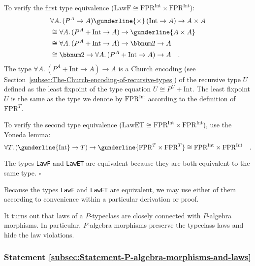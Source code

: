 To verify the first type equivalence ($\text{LawF}\cong\text{FPR}^{\text{Int}}\times\text{FPR}^{\text{Int}}$):
\begin{align*}
 & \forall A.\,(P^{A}\rightarrow A)\gunderline{\times}\,(\text{Int}\rightarrow A)\rightarrow A\times A\\
 & \cong\forall A.\,(P^{A}+\text{Int}\rightarrow A)\rightarrow\gunderline{A\times A}\\
 & \cong\forall A.\,(P^{A}+\text{Int}\rightarrow A)\rightarrow\bbnum 2\rightarrow A\\
 & \cong\bbnum 2\rightarrow\forall A.\,(P^{A}+\text{Int}\rightarrow A)\rightarrow A\quad.
\end{align*}
The type $\forall A.\,(P^{A}+\text{Int}\rightarrow A)\rightarrow A$
is a Church encoding (see Section~\ref{subsec:The-Church-encoding-of-recursive-types})
of the recursive type $U$ defined as the least fixpoint of the type
equation $U\cong P^{U}+\text{Int}$. The least fixpoint $U$ is the
same as the type we denote by $\text{FPR}^{\text{Int}}$ according
to the definition of $\text{FPR}^{T}$.

To verify the second type equivalence ($\text{LawET}\cong\text{FPR}^{\text{Int}}\times\text{FPR}^{\text{Int}}$),
use the Yoneda lemma:
\[
\forall T.\,(\gunderline{\text{Int}}\rightarrow T)\rightarrow\gunderline{\text{FPR}^{T}\times\text{FPR}^{T}}\cong\text{FPR}^{\text{Int}}\times\text{FPR}^{\text{Int}}\quad.
\]
\vspace{-1\baselineskip}

The types \lstinline!LawF!
and \lstinline!LawET! are
equivalent because they are both equivalent to the same type. $\square$

Because the types \lstinline!LawF!
and \lstinline!LawET! are
equivalent, we may use either of them according to convenience within
a particular derivation or proof.

It turns out that laws of a $P$-typeclass are closely connected with
$P$-algebra morphisms. In particular, $P$-algebra morphisms preserve
the typeclass laws and hide the law violations.

\subsubsection{Statement \label{subsec:Statement-P-algebra-morphisms-and-laws}\ref{subsec:Statement-P-algebra-morphisms-and-laws} }

